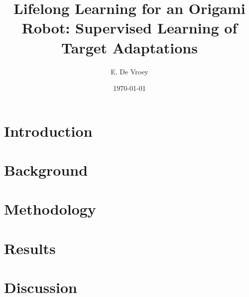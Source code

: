 \documentclass[a4paper, 10pt]{IEEEtran}
\title{Lifelong Learning for an Origami Robot: Supervised Learning of Target Adaptations}
\author{E. De Vroey}
\date{\today}
\begin{document}
    \maketitle

    \begin{abstract}
        \lipsum[1]
    \end{abstract}

    \section{Introduction}\label{sec:introduction}
    
    \FloatBarrier

    \section{Background}\label{sec:background}
    
    \FloatBarrier

    \section{Methodology}\label{sec:methodology}
    
    \FloatBarrier

    \section{Results}\label{sec:results}
    
    \FloatBarrier

    \section{Discussion}\label{sec:discussion}
    
    \FloatBarrier

    \printbibliography

    \appendices
    
\end{document}
